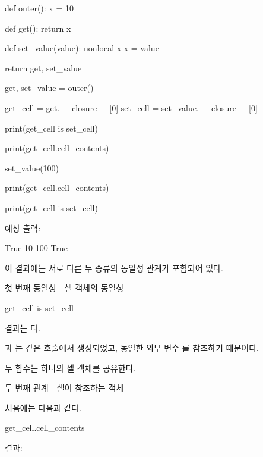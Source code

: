 \begin{dhkcode}
def outer():
    x = 10

    def get():
        return x

    def set_value(value):
        nonlocal x
        x = value

    return get, set_value


get, set_value = outer()

get_cell = get.__closure__[0]
set_cell = set_value.__closure__[0]

print(get_cell is set_cell)

print(get_cell.cell_contents)

set_value(100)

print(get_cell.cell_contents)

print(get_cell is set_cell)
\end{dhkcode}

예상 출력:

\begin{dhkzsh}
True
10
100
True
\end{dhkzsh}

이 결과에는 서로 다른 두 종류의 동일성 관계가 포함되어 있다.

\begin{dhknote}
\begin{dhksmry}[centered]
첫 번째 동일성 - 셀 객체의 동일성
\end{dhksmry}
\end{dhknote}

\begin{dhkcode}
get_cell is set_cell
\end{dhkcode}

결과는 다.

과 는 같은  호출에서 생성되었고, 동일한 외부 변수 를 참조하기 때문이다.

두 함수는 하나의 셀 객체를 공유한다.

\begin{dhknote}
\begin{dhksmry}[centered]
두 번째 관계 - 셀이 참조하는 객체
\end{dhksmry}
\end{dhknote}

처음에는 다음과 같다.

\begin{dhkcode}
get_cell.cell_contents
\end{dhkcode}

결과:

